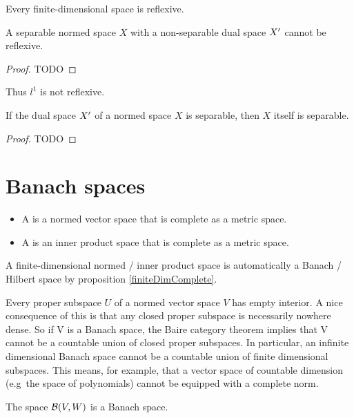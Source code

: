 \begin{lemma}
Every finite-dimensional space is reflexive.
\end{lemma}

\begin{proposition}
A separable normed space $X$ with a non-separable dual space ${X}^\prime$ cannot be reflexive. 
\end{proposition}
\begin{proof}
TODO
\end{proof}
Thus $l^1$ is not reflexive.

\begin{proposition}
If the dual space ${X}^\prime$ of a  normed space $X$ is separable, then $X$ itself is separable. 
\end{proposition}
\begin{proof}
TODO
\end{proof}










\chapter{Banach spaces}
\begin{definition}
\begin{itemize}
\item A  is a normed vector space that is complete as a metric space.
\item A  is an inner product space that is complete as a metric space.
\end{itemize}
\end{definition}

A finite-dimensional normed / inner product space is automatically a Banach / Hilbert space by proposition \ref{finiteDimComplete}.

Every proper subspace $U$ of a normed vector space $V$ has empty interior.
A nice consequence of this is that any closed proper subspace is necessarily nowhere dense. So if V is a Banach space, the Baire category theorem implies that V cannot be a countable union of closed proper subspaces. In particular, an infinite dimensional Banach space cannot be a countable union of finite dimensional subspaces. This means, for example, that a vector space of countable dimension (e.g\ the space of polynomials) cannot be equipped with a complete norm.

The space $\operatorname{\mathcal{B}}(V,W)$ is a Banach space.

